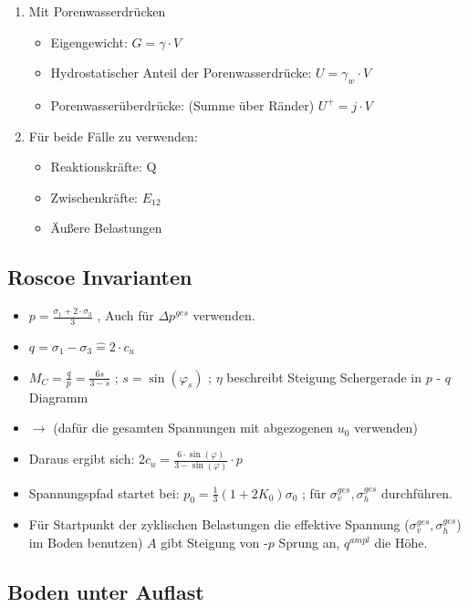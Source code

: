 \documentclass[fleqn,twoside]{article}
\begin{document}
\begin{itemize}
\begin{enumerate}
		\item Mit Porenwasserdrücken
		\begin{itemize}
			\item Eigengewicht: $G=\gamma \cdot V$
			\item Hydrostatischer Anteil der Porenwasserdrücke: $U=\gamma_w \cdot V$
			\item Porenwasserüberdrücke: (Summe über Ränder) $U^+=j \cdot V$
		\end{itemize}
		\item Für beide Fälle zu verwenden:
		\begin{itemize}
			\item Reaktionskräfte: Q
			\item Zwischenkräfte: $E_{12}$
			\item Äußere Belastungen
		\end{itemize}
	\end{enumerate}
\end{itemize}

\subsection{Roscoe Invarianten}

\begin{itemize}
	\item $p=\frac{\sigma_1+2\cdot\sigma_3}{3}$ , Auch für $\Delta p^{ges}$ verwenden.
	\item $q=\sigma_1-\sigma_3 \widehat{=} 2 \cdot c_u$
	\item $M_C=\frac{q}{p} = \frac{6s}{3-s}$ ; $s=\sin(\varphi_s)$ ; $\eta$ beschreibt Steigung Schergerade in $p$ - $q$ Diagramm 
	\item $\rightarrow$ (dafür die gesamten Spannungen mit abgezogenen $u_0$ verwenden)
	\item Daraus ergibt sich: $2c_u=\frac{6 \cdot \sin(\varphi)}{3-\sin(\varphi)} \cdot p$
	\item Spannungspfad startet bei: $p_0 = \frac{1}{3} (1+2K_0)\sigma_0$ ; für $\sigma_v^{ges},\sigma_h^{ges}$ durchführen.
	\item Für Startpunkt der zyklischen Belastungen die effektive Spannung ($\sigma_v^{ges},\sigma_h^{ges}$) im Boden benutzen)
		$A$ gibt Steigung von -$p$ Sprung an, $q^{ampl}$ die Höhe.
\end{itemize}

\subsection{Boden unter Auflast}
\end{document}
